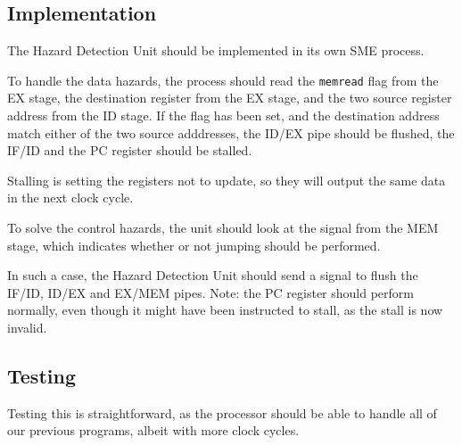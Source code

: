 \documentclass{beamer}
\begin{document}
\subsection{Implementation}
\begin{frame}
    The Hazard Detection Unit should be implemented in its own SME process.

    \vspace{\baselineskip}
    To handle the data hazards, the process should read the \texttt{memread}
    flag from the EX stage, the destination register from the EX stage, and the
    two source register address from the ID stage. If the flag has been set,
    and the destination address match either of the two source adddresses, the
    ID/EX pipe should be flushed, the IF/ID and the PC register should be
    stalled.

    \vspace{\baselineskip}
    Stalling is setting the registers not to update, so they will output the
    same data in the next clock cycle.
\end{frame}
\begin{frame}
    To solve the control hazards, the unit should look at the signal from the
    MEM stage, which indicates whether or not jumping should be performed.

    \vspace{\baselineskip}
    In such a case, the Hazard Detection Unit should send a signal to flush the
    IF/ID, ID/EX and EX/MEM pipes. Note: the PC register should perform
    normally, even though it might have been instructed to stall, as the stall
    is now invalid.
\end{frame}

\subsection{Testing}
\begin{frame}
    Testing this is straightforward, as the processor should be able to handle
    all of our previous programs, albeit with more clock cycles.
\end{frame}

\AtBeginSection{}
\section*{}

%  
%  
\end{document}
